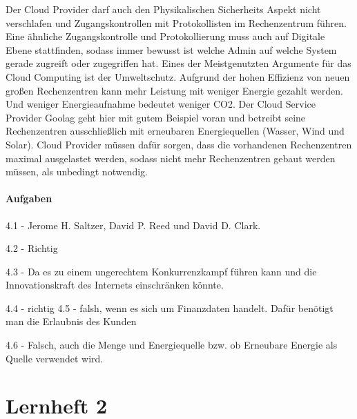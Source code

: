 \documentclass[a4paper,10pt]{article}
\begin{document}
Der Cloud Provider darf auch den Physikalischen Sicherheits Aspekt nicht verschlafen und Zugangskontrollen mit Protokollisten im Rechenzentrum führen. Eine ähnliche Zugangskontrolle und Protokollierung muss auch auf Digitale Ebene stattfinden, sodass immer bewusst ist welche Admin auf welche System gerade zugreift oder zugegriffen hat.
\vspace{3mm}
Eines der Meistgenutzten Argumente für das Cloud Computing ist der Umweltschutz. Aufgrund der hohen Effizienz von neuen großen Rechenzentren kann mehr Leistung mit weniger Energie gezahlt werden. Und weniger Energieaufnahme bedeutet weniger CO2. Der Cloud Service Provider Goolag geht hier mit gutem Beispiel voran und betreibt seine Rechenzentren ausschließlich mit erneubaren Energiequellen (Wasser, Wind und Solar). Cloud Provider müssen dafür sorgen, dass die vorhandenen Rechenzentren maximal ausgelastet werden, sodass nicht mehr Rechenzentren gebaut werden müssen, als unbedingt notwendig.

\subsection{Aufgaben}
4.1 - Jerome H. Saltzer, David P. Reed und David D. Clark.
\vspace{3mm}

4.2 - Richtig
\vspace{3mm}

4.3 - Da es zu einem ungerechtem Konkurrenzkampf führen kann und die Innovationskraft des Internets einschränken könnte.
\vspace{3mm}

4.4 - richtig
\vspace{3mm}
4.5 - falsh, wenn es sich um Finanzdaten handelt. Dafür benötigt man die Erlaubnis des Kunden
\vspace{3mm}

4.6 - Falsch, auch die Menge und Energiequelle bzw. ob Erneubare Energie als Quelle verwendet wird.

\part{Lernheft 2}
\end{document}
